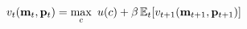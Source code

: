   \begin{equation}\begin{gathered}\begin{aligned}
        v_{t}(\mathbf{m}_{t},\mathbf{p}_{t})  & = \max_{c}~ u(c) + \beta \operatorname{\mathbb{E}}_{t}[ v_{t+1}(\mathbf{m}_{t+1},\mathbf{p}_{t+1})]\label{eq:vrecurse}
      \end{aligned}\end{gathered}\end{equation}
